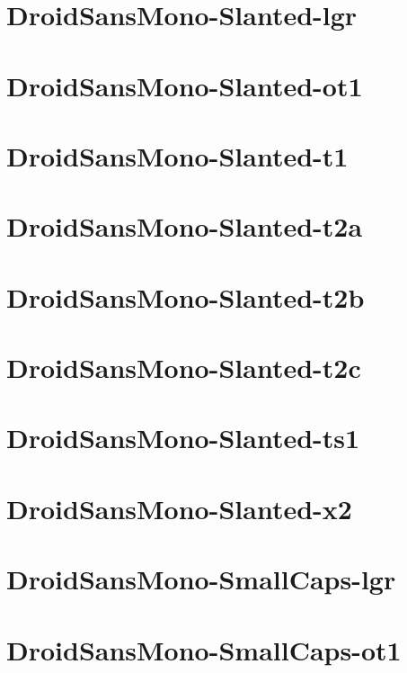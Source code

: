 \documentclass{article}
\begin{document}
\section{DroidSansMono-Slanted-lgr}

\section{DroidSansMono-Slanted-ot1}

\section{DroidSansMono-Slanted-t1}

\section{DroidSansMono-Slanted-t2a}

\section{DroidSansMono-Slanted-t2b}

\section{DroidSansMono-Slanted-t2c}

\section{DroidSansMono-Slanted-ts1}

\section{DroidSansMono-Slanted-x2}

\section{DroidSansMono-SmallCaps-lgr}

\section{DroidSansMono-SmallCaps-ot1}
\end{document}
